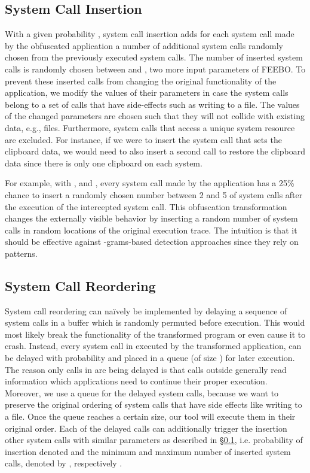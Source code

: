\documentclass{llncs}
\begin{document}
\subsection{System Call Insertion} \label{subsec:insertion}
With a given probability , system call insertion adds for each system call made by the obfuscated application a number of additional system calls randomly chosen from the previously executed system calls. The number of inserted system calls is randomly chosen between  and , two more input parameters of FEEBO. To prevent these inserted calls from changing the original functionality of the application, we modify the values of their parameters in case the system calls belong to a set  of calls that have side-effects such as writing to a file. The values of the changed parameters are chosen such that they will not collide with existing data, e.g., files. Furthermore, system calls that access a unique system resource are excluded. For instance, if we were to insert the system call that sets the clipboard data, we would need to also insert a second call to restore the clipboard data since there is only one clipboard on each system. 

For example, with ,  and , every system call made by the application has a 25\% chance to insert a randomly chosen number between 2 and 5 of system calls after the execution of the intercepted system call. This obfuscation transformation changes the externally visible behavior by inserting a random number of system calls in random locations of the original execution trace. The intuition is that it should be effective against -grams-based detection approaches since they rely on patterns.

\subsection{System Call Reordering} \label{subsec:reordering} 
System call reordering can na\"{i}vely be implemented by delaying a sequence of system calls in a buffer which is randomly permuted before execution. This would most likely break the functionality of the transformed program or even cause it to crash. Instead, every system call in  executed by the transformed application, can be delayed with probability  and placed in a queue (of size ) for later execution. The reason only calls in  are being delayed is that calls outside  generally read information which applications need to continue their proper execution. Moreover, we use a queue for the delayed system calls, because we want to preserve the original ordering of system calls that have side effects like writing to a file. Once the queue reaches a certain size, our tool will execute them in their original order.
Each of the delayed calls can additionally trigger the insertion other system calls with similar parameters as described in \S\ref{subsec:insertion}, i.e. probability of insertion denoted  and the minimum and maximum number of inserted system calls, denoted by , respectively . 
\end{document}
